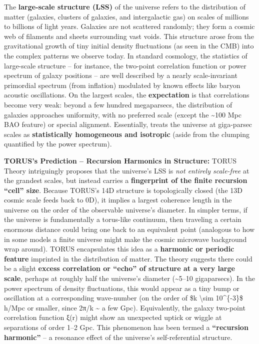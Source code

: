 \documentclass[
]{article}
\begin{document}
The \textbf{large-scale structure (LSS)} of the universe refers to the
distribution of matter (galaxies, clusters of galaxies, and
intergalactic gas) on scales of millions to billions of light years.
Galaxies are not scattered randomly; they form a cosmic web of filaments
and sheets surrounding vast voids. This structure arose from the
gravitational growth of tiny initial density fluctuations (as seen in
the CMB) into the complex patterns we observe today. In standard \LambdaCDM
cosmology, the statistics of large-scale structure -- for instance, the
two-point correlation function or power spectrum of galaxy positions --
are well described by a nearly scale-invariant primordial spectrum (from
inflation) modulated by known effects like baryon acoustic oscillations.
On the largest scales, the \textbf{\LambdaCDM expectation} is that
correlations become very weak: beyond a few hundred megaparsecs, the
distribution of galaxies approaches uniformity, with no preferred scale
(except the \textasciitilde100 Mpc BAO feature) or special alignment.
Essentially, \LambdaCDM treats the universe at giga-parsec scales as
\textbf{statistically homogeneous and isotropic} (aside from the
clumping quantified by the power spectrum).

\textbf{TORUS's Prediction -- Recursion Harmonics in Structure:} TORUS
Theory intriguingly proposes that the universe's LSS is \emph{not
entirely scale-free} at the grandest scales, but instead carries a
\textbf{fingerprint of the finite recursion ``cell'' size}. Because
TORUS's 14D structure is topologically closed (the 13D cosmic scale
feeds back to 0D), it implies a largest coherence length in the universe
on the order of the observable universe's diameter. In simpler terms, if
the universe is fundamentally a torus-like continuum, then traveling a
certain enormous distance could bring one back to an equivalent point
(analogous to how in some models a finite universe might make the cosmic
microwave background wrap around). TORUS encapsulates this idea as a
\textbf{harmonic or periodic feature} imprinted in the distribution of
matter\hspace{0pt}. The theory suggests there could be a slight
\textbf{excess correlation or ``echo'' of structure at a very large
scale}, perhaps at roughly half the universe's diameter
(\textasciitilde5--10 gigaparsecs)\hspace{0pt}. In the power spectrum of
density fluctuations, this would appear as a tiny bump or oscillation at
a corresponding wave-number (on the order of \$k \textbackslash sim
10\^{}\{-3\}\$ h/Mpc or smaller, since 2π/k \textasciitilde{} a few
Gpc). Equivalently, the galaxy two-point correlation function ξ(r) might
show an unexpected uptick or wiggle at separations of order 1--2
Gpc\hspace{0pt}. This phenomenon has been termed a \textbf{``recursion
harmonic''} -- a resonance effect of the universe's self-referential
structure.
\end{document}
